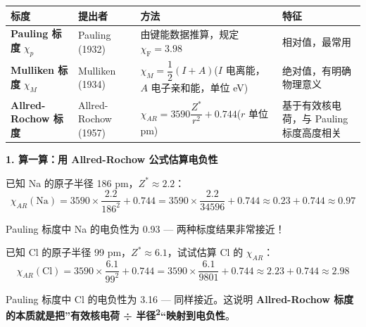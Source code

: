 \documentclass[a4paper,11pt]{ctexart}
\newcounter{none}
\newcommand{\箭}{\ensuremath{\rightarrow}}
\newcommand{\左箭}{\ensuremath{\leftarrow}}
\newcommand{\上箭}{\ensuremath{\uparrow}}
\newcommand{\下箭}{\ensuremath{\downarrow}}
\newcommand{\衡}{\ensuremath{\rightleftharpoons}}
\newcommand{\双箭}{\ensuremath{\leftrightarrow}}
\newcommand{\约等于}{\ensuremath{\approx}}
\newcommand{\小于等于}{\ensuremath{\leq}}
\newcommand{\大于等于}{\ensuremath{\geq}}
\newcommand{\不等于}{\ensuremath{\neq}}
\newcommand{\西格马}{\ensuremath{\sigma}}
\newcommand{\派}{\ensuremath{\pi}}
\begin{document}
{\def\LTcaptype{none} %
\begin{longtable}[]{@{}
  >{\raggedright\arraybackslash}p{}
  >{\raggedright\arraybackslash}p{}
  >{\raggedright\arraybackslash}p{}
  >{\raggedright\arraybackslash}p{}@{}}
\toprule\noalign{}
\begin{minipage}[b]{\linewidth}\raggedright
标度
\end{minipage} & \begin{minipage}[b]{\linewidth}\raggedright
提出者
\end{minipage} & \begin{minipage}[b]{\linewidth}\raggedright
方法
\end{minipage} & \begin{minipage}[b]{\linewidth}\raggedright
特征
\end{minipage} \\
\midrule\noalign{}
\endhead
\bottomrule\noalign{}
\endlastfoot
\textbf{Pauling 标度} \(\chi_p\) & Pauling (1932) & 由键能数据推算，规定 \(\chi_{\mathrm{F}}=3.98\) & 相对值，最常用 \\
\textbf{Mulliken 标度} \(\chi_M\) & Mulliken (1934) & \(\chi_M = \dfrac{1}{2}(I + A)\)(\(I\) 电离能，\(A\) 电子亲和能，单位 eV) & 绝对值，有明确物理意义 \\
\textbf{Allred-Rochow 标度} & Allred-Rochow (1957) & \(\chi_{AR} = 3590\dfrac{Z^*}{r^2} + 0.744\)(\(r\) 单位 pm) & 基于有效核电荷，与 Pauling 标度高度相关 \\
\end{longtable}
}

\textbf{1. 算一算：用 Allred-Rochow 公式估算电负性}

已知 Na 的原子半径 186 pm，\(Z^* \approx 2.2\)：
\[\chi_{AR}(\mathrm{Na}) = 3590 \times \frac{2.2}{186^2} + 0.744 = 3590 \times \frac{2.2}{34596} + 0.744 \approx 0.23 + 0.744 \approx 0.97\]

Pauling 标度中 Na 的电负性为 0.93 --- 两种标度结果非常接近！

已知 Cl 的原子半径 99 pm，\(Z^* \approx 6.1\)，试试估算 Cl 的 \(\chi_{AR}\)：
\[\chi_{AR}(\mathrm{Cl}) = 3590 \times \frac{6.1}{99^2} + 0.744 = 3590 \times \frac{6.1}{9801} + 0.744 \approx 2.23 + 0.744 \approx 2.98\]

Pauling 标度中 Cl 的电负性为 3.16 --- 同样接近。这说明 \textbf{Allred-Rochow 标度的本质就是把''有效核电荷 ÷ 半径\textsuperscript{2}``映射到电负性}。
\end{document}
